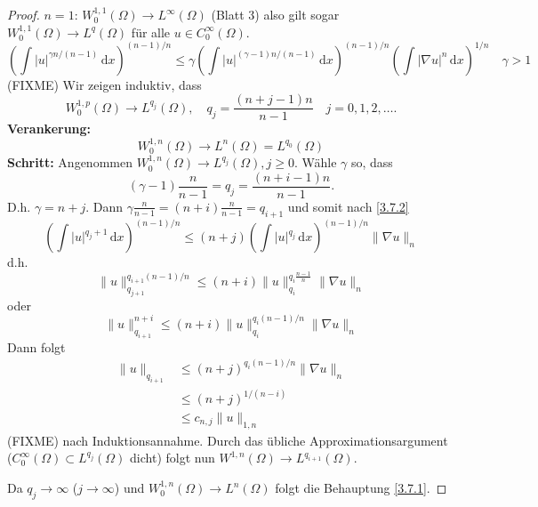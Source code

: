 \documentclass[
paper=a4,
bibtotocnumbered,
liststotocnumbered,
tablecaptionabove,
pointlessnumbers,
twoside,
openright,
10pt
]
{report}
\theoremstyle{definition}
\numberwithin{equation}{chapter}
\begin{document}
\begin{proof}
$n=1$: $W_0^{1,1}(\Omega) \to L^\infty(\Omega)$ (Blatt 3) also gilt sogar $W_0^{1,1}(\Omega) \to L^q(\Omega)$ 
für alle $u\in C_0^\infty(\Omega)$.
\begin{equation}\label{3.7.2}
 \left ( \int |u|^{\gamma n/(n-1)} \, \mathrm dx \right )^{(n-1)/n} \le \gamma \left ( \int |u|^{(\gamma-1)n/(n-1)}\, \mathrm dx\right )^{(n-1)/n} (\int |\nabla u|^n \, \mathrm dx)^{1/n} \quad \gamma>1
\end{equation}
(FIXME)
Wir zeigen induktiv, dass
\begin{equation}
 W_0^{1,p}(\Omega) \to L^{q_j}(\Omega), \quad q_j = \frac{(n+j-1)n}{n-1}\quad j=0,1,2,\ldots.
\end{equation}
\textbf{Verankerung:} 
\begin{equation}
 W_0^{1,n}(\Omega) \to L^n(\Omega) = L^{q_0}(\Omega)
\end{equation}
\textbf{Schritt:} Angenommen $W_0^{1,n}(\Omega) \to L^{q_j}(\Omega), j\ge 0$. Wähle $\gamma$ so, dass 
\begin{equation}
 (\gamma-1) \frac{n}{n-1} = q_j = \frac{(n+i-1)n}{n-1}. 
\end{equation}
D.h. $\gamma=n+j$. Dann $\gamma \frac{n}{n-1} = (n+i) \frac{n}{n-1} = q_{i+1}$ und somit nach  \eqref{3.7.2}
\begin{equation}
 (\int |u|^{q_j+1} \, \mathrm dx)^{(n-1)/n} \le (n+j) ( \int |u|^{q_j}\, \mathrm dx)^{(n-1)/n} \| \nabla u\|_n
\end{equation}
d.h.
\begin{equation}
 \|u\|_{q_{j+1}}^{q_{i+1} (n-1)/n} \le ( n+i) \| u\|_{q_i}^{q_i \frac{n-1}{n}} \| \nabla u\|_n 
\end{equation}
oder
\begin{equation}
 \| u\|^{n+i}_{q_{i+1}} \le (n+i) \| u\|_{q_i}^{q_i (n-1)/n}\| \nabla u\|_n
\end{equation}
Dann folgt
\begin{align*}
 \|u\|_{q_{i+1}} &\le (n+j)^{q_i (n-1)/n}\| \nabla u\|_n\\
 &\le (n+j)^{1/(n-i)}\\ %
 &\le c_{n,j} \| u \|_{1,n}
\end{align*}(FIXME)
nach Induktionsannahme. Durch das übliche Approximationsargument ($C_0^\infty(\Omega) \subset L^{q_j}(\Omega)$ dicht) folgt nun $W^{1,n}(\Omega) \to L^{q_{i+1}}(\Omega)$.

Da $q_j \to \infty$ ($j\to \infty$) und $W_0^{1,n}(\Omega) \to L^n(\Omega)$ folgt die Behauptung \eqref{3.7.1}.
\end{proof}
\end{document}
